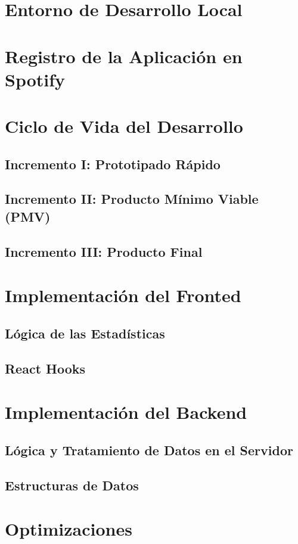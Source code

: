 \section{Entorno de Desarrollo Local}

\section{Registro de la Aplicación en Spotify}

\section{Ciclo de Vida del Desarrollo}

\subsection{Incremento I: Prototipado Rápido}

\subsection{Incremento II: Producto Mínimo Viable (PMV)}

\subsection{Incremento III: Producto Final}

\section{Implementación del Fronted}

\subsection{Lógica de las Estadísticas}

\subsection{React Hooks}

\section{Implementación del Backend}

\subsection{Lógica y Tratamiento de Datos en el Servidor}

\subsection{Estructuras de Datos}

\section{Optimizaciones}